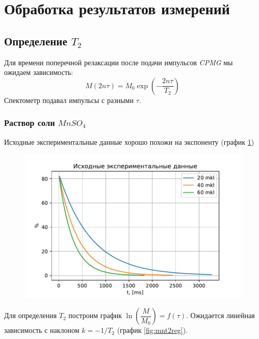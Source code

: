 \section{Обработка результатов измерений}
\subsection{Определение $T_2$}
Для времени поперечной релаксации после подачи импульсов \textit{CPMG} мы ожидаем зависимость:
\begin{equation}
\label{eq:M2-from-T2}
M (2n \tau) = M_0 \exp \left( -\dfrac{2n\tau}{T_2} \right)
\end{equation}
Спектометр подавал импульсы с разными $ \tau $.
\subsubsection{Раствор соли $MnSO_4$}
Исходные экспериментальные данные хорошо похожи на экспоненту (график \ref{fig:mnt2exper})
\begin{figure}[h]
	\hspace{-5em}
	\includegraphics[width=1.2\linewidth]{data/Mn_T_2_exper}
	\caption{}
	\label{fig:mnt2exper}
\end{figure}

Для определения $ T_2 $ построим график $ \ln \left(\dfrac{M}{M_0} \right) = f(\tau) $. Ожидается линейная зависимость с наклоном $ k = -1/T_2 $ (график \ref{fig:mnt2reg}).

